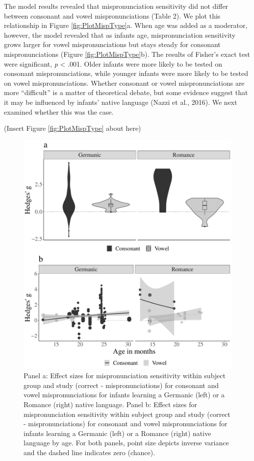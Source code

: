 \documentclass[
  man, noextraspace]{apa6}
\begin{document}
The model results revealed that mispronunciation sensitivity did not differ between consonant and vowel mispronunciations (Table 2). We plot this relationship in Figure \ref{fig:PlotMispType}a. When age was added as a moderator, however, the model revealed that as infants age, mispronunciation sensitivity grows larger for vowel mispronunciations but stays steady for consonant mispronunciations (Figure \ref{fig:PlotMispType}b). The results of Fisher's exact test were significant, \emph{p} \textless{} .001. Older infants were more likely to be tested on consonant mispronunciations, while younger infants were more likely to be tested on vowel mispronunciations. Whether consonant or vowel mispronunciations are more \enquote{difficult} is a matter of theoretical debate, but some evidence suggest that it may be influenced by infants' native language (Nazzi et al., 2016). We next examined whether this was the case.

(Insert Figure \ref{fig:PlotMispType} about here)

\begin{figure}
\centering
\includegraphics{VonHolzenBergmann_MPMetaAnalysis_files/figure-latex/PlotCVEffectLang-1.pdf}
\caption{\label{fig:PlotCVEffectLang}Panel a: Effect sizes for mispronunciation sensitivity within subject group and study (correct - mispronunciations) for consonant and vowel mispronunciations for infants learning a Germanic (left) or a Romance (right) native language. Panel b: Effect sizes for mispronunciation sensitivity within subject group and study (correct - mispronunciations) for consonant and vowel mispronunciations for infants learning a Germanic (left) or a Romance (right) native language by age. For both panels, point size depicts inverse variance and the dashed line indicates zero (chance).}
\end{figure}
\end{document}
